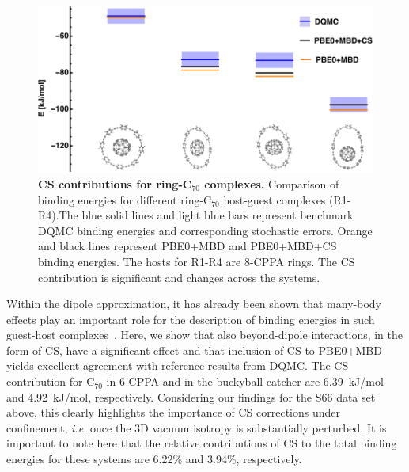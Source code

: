 \documentclass[aps,prl,groupaddress, twocolumn]{revtex4-1}  %
\begin{document}
\begin{figure}[hbtp]
\includegraphics[scale=1.]{Plots/Rings_new.pdf}
\caption{\textbf{CS contributions for ring-C$_{70}$ complexes.} Comparison of binding energies for different ring-C$_{70}$ host-guest complexes (R1-R4).The blue solid lines and light blue bars represent benchmark DQMC binding energies and corresponding stochastic errors. Orange and black lines represent PBE0+MBD and PBE0+MBD+CS binding energies. The hosts for R1-R4 are 8-CPPA rings. The CS contribution is significant and changes across the systems.}\label{fig:rings}
\end{figure}

Within the dipole approximation, it has already been shown that many-body effects play an important role for the description of binding energies in such guest-host complexes~\cite{hermann_ncomm2017}. Here, we show that also beyond-dipole interactions, in the form of CS, have a significant effect and that inclusion of CS to PBE0+MBD yields excellent agreement with reference results from DQMC\@. The CS contribution for C$_{70}$ in 6-CPPA and in the buckyball-catcher are 6.39~kJ/mol and 4.92~kJ/mol, respectively. Considering our findings for the S66 data set above, this clearly highlights the importance of CS corrections under confinement, \textit{i.e.} once the 3D vacuum isotropy is substantially perturbed. It is important to note here that the relative contributions of CS to the total binding energies for these systems are 6.22\% and 3.94\%, respectively. 
\end{document}
